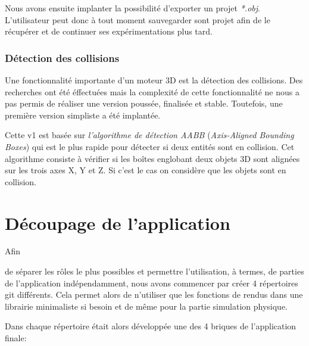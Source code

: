 \documentclass[11pt]{report}
\begin{document}
Nous avons ensuite implanter la possibilité d'exporter un projet \textit{*.obj}. L'utilisateur peut donc à tout moment sauvegarder sont projet afin de le récupérer et de continuer ses expérimentations plus tard.


\subsection{Détection des collisions}
Une fonctionnalité importante d'un moteur 3D est la détection des collisions. Des recherches ont été éffectuées mais la complexité de cette fonctionnalité ne nous a pas permis de réaliser une version poussée, finalisée et stable. Toutefois, une première version simpliste a été implantée.

Cette v1 est basée sur \textit{l'algorithme de détection AABB} (\textit{Axis-Aligned Bounding Boxes}) qui est le plus rapide pour détecter si deux entités sont en collision. Cet algorithme consiste à vérifier si les boîtes englobant deux objets 3D sont alignées sur les trois axes X, Y et Z. Si c'est le cas on considère que les objets sont en collision.



\chapter{Découpage de l'application}

\hypertarget{découpage}{Afin} de séparer les rôles le plus possibles et permettre l'utilisation, à termes, de parties de l'application
indépendamment, nous avons commencer par créer 4 répertoires git différents. Cela permet alors de n'utiliser que
les fonctions de rendus dans une librairie minimaliste si besoin et de même pour la partie simulation physique.\newline

Dans chaque répertoire était alors développée une des 4 briques de l'application finale:\newline
\end{document}
